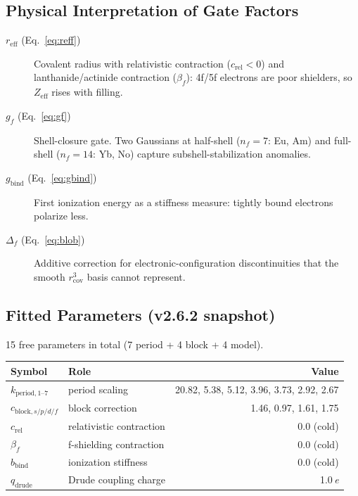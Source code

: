 \documentclass[11pt,a4paper]{article}
\begin{document}
\subsection{Physical Interpretation of Gate Factors}

\begin{description}
  \item[$r_\mathrm{eff}$ (Eq.~\ref{eq:reff})]
    Covalent radius with relativistic contraction ($c_\mathrm{rel} < 0$)
    and lanthanide/actinide contraction ($\beta_f$): 4f/5f electrons are
    poor shielders, so $Z_\mathrm{eff}$ rises with filling.
  \item[$g_f$ (Eq.~\ref{eq:gf})]
    Shell-closure gate.  Two Gaussians at half-shell ($n_f=7$: Eu, Am)
    and full-shell ($n_f=14$: Yb, No) capture subshell-stabilization
    anomalies.
  \item[$g_\mathrm{bind}$ (Eq.~\ref{eq:gbind})]
    First ionization energy as a stiffness measure: tightly bound
    electrons polarize less.
  \item[$\Delta_f$ (Eq.~\ref{eq:blob})]
    Additive correction for electronic-configuration discontinuities that
    the smooth $r_\mathrm{cov}^3$ basis cannot represent.
\end{description}

\subsection{Fitted Parameters (v2.6.2 snapshot)}

15 free parameters in total (7 period + 4 block + 4 model).

\begin{center}
\begin{tabular}{llr}
\toprule
\textbf{Symbol} & \textbf{Role} & \textbf{Value} \\
\midrule
$k_{\mathrm{period},1\text{--}7}$ & period scaling & 20.82, 5.38, 5.12, 3.96, 3.73, 2.92, 2.67 \\
$c_{\mathrm{block},s/p/d/f}$    & block correction & 1.46, 0.97, 1.61, 1.75 \\
$c_\mathrm{rel}$                & relativistic contraction & 0.0 (cold) \\
$\beta_f$                        & f-shielding contraction & 0.0 (cold) \\
$b_\mathrm{bind}$               & ionization stiffness & 0.0 (cold) \\
$q_\mathrm{drude}$              & Drude coupling charge & 1.0\,\textit{e} \\
\bottomrule
\end{tabular}
\end{center}
\end{document}
